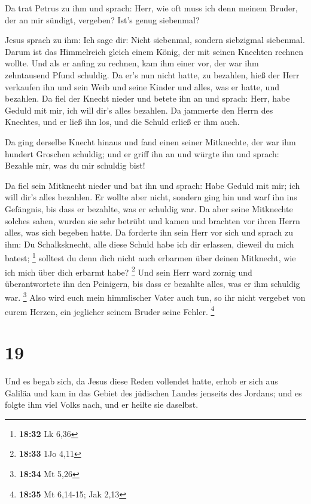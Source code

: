  Da trat Petrus zu ihm und sprach: Herr, wie oft muss ich
denn meinem Bruder, der an mir sündigt, vergeben? Ist's genug siebenmal?

 Jesus sprach zu ihm: Ich sage dir: Nicht siebenmal,
sondern siebzigmal siebenmal.  Darum ist das Himmelreich
gleich einem König, der mit seinen Knechten rechnen wollte.
 Und als er anfing zu rechnen, kam ihm einer vor, der war
ihm zehntausend Pfund schuldig.  Da er's nun nicht hatte,
zu bezahlen, hieß der Herr verkaufen ihn und sein Weib und seine Kinder
und alles, was er hatte, und bezahlen.  Da fiel der
Knecht nieder und betete ihn an und sprach: Herr, habe Geduld mit mir,
ich will dir's alles bezahlen.  Da jammerte den Herrn des
Knechtes, und er ließ ihn los, und die Schuld erließ er ihm auch.

 Da ging derselbe Knecht hinaus und fand einen seiner
Mitknechte, der war ihm hundert Groschen schuldig; und er griff ihn an
und würgte ihn und sprach: Bezahle mir, was du mir schuldig bist!

 Da fiel sein Mitknecht nieder und bat ihn und sprach:
Habe Geduld mit mir; ich will dir's alles bezahlen.  Er
wollte aber nicht, sondern ging hin und warf ihn ins Gefängnis, bis dass
er bezahlte, was er schuldig war.  Da aber seine
Mitknechte solches sahen, wurden sie sehr betrübt und kamen und brachten
vor ihren Herrn alles, was sich begeben hatte.  Da
forderte ihn sein Herr vor sich und sprach zu ihm: Du Schalksknecht,
alle diese Schuld habe ich dir erlassen, dieweil du mich batest;
\footnote{\textbf{18:32} Lk 6,36}  solltest du denn dich
nicht auch erbarmen über deinen Mitknecht, wie ich mich über dich
erbarmt habe? \footnote{\textbf{18:33} 1Jo 4,11}  Und
sein Herr ward zornig und überantwortete ihn den Peinigern, bis dass er
bezahlte alles, was er ihm schuldig war. \footnote{\textbf{18:34} Mt
  5,26}  Also wird euch mein himmlischer Vater auch tun,
so ihr nicht vergebet von eurem Herzen, ein jeglicher seinem Bruder
seine Fehler. \footnote{\textbf{18:35} Mt 6,14-15; Jak 2,13}

\hypertarget{section-11}{%
\section{19}\label{section-11}}

 Und es begab sich, da Jesus diese Reden vollendet hatte,
erhob er sich aus Galiläa und kam in das Gebiet des jüdischen Landes
jenseits des Jordans;  und es folgte ihm viel Volks nach,
und er heilte sie daselbst.

